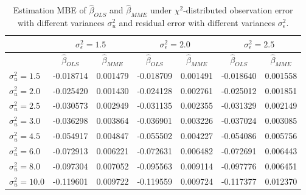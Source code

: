 \documentclass{article}
\begin{document}
\begin{table}[ht]
    \centering
    \caption{Estimation MBE of $\hat{\beta}_{OLS}$ and $\hat{\beta}_{MME}$ under $\chi^2$-distributed observation error with different variances $\sigma^2_u$ and residual error with different variances $\sigma^2_\epsilon$.}
    \label{Tab:MBE_chi}
    \begin{tabular}[t]{lcccccc}
        \hline
        &\multicolumn{2}{c}{$\sigma^2_\epsilon=1.5$}&\multicolumn{2}{c}{$\sigma^2_\epsilon=2.0$}&\multicolumn{2}{c}{$\sigma^2_\epsilon=2.5$}\\
        \hline
        &$\hat{\beta}_{OLS}$&$\hat{\beta}_{MME}$&$\hat{\beta}_{OLS}$&$\hat{\beta}_{MME}$&$\hat{\beta}_{OLS}$&$\hat{\beta}_{MME}$\\
        \hline
        $\sigma^2_u = 1.5$&-0.018714&0.001479&-0.018709&0.001491&-0.018640&0.001558\\
        $\sigma^2_u = 2.0$&-0.025420&0.001430&-0.024128&0.002761&-0.025012&0.001851\\
        $\sigma^2_u = 2.5$&-0.030573&0.002949&-0.031135&0.002355&-0.031329&0.002149\\
        $\sigma^2_u = 3.0$&-0.036298&0.003864&-0.036901&0.003226&-0.037024&0.003085\\
        $\sigma^2_u = 4.5$&-0.054917&0.004847&-0.055502&0.004227&-0.054086&0.005756\\
        $\sigma^2_u = 6.0$&-0.072913&0.006221&-0.072631&0.006482&-0.072691&0.006443\\
        $\sigma^2_u = 8.0$&-0.097304&0.007052&-0.095563&0.009114&-0.097776&0.006451\\
        $\sigma^2_u = 10.0$&-0.119601&0.009722&-0.119559&0.009724&-0.117377&0.012370\\
    \end{tabular}
\end{table}
\end{document}
